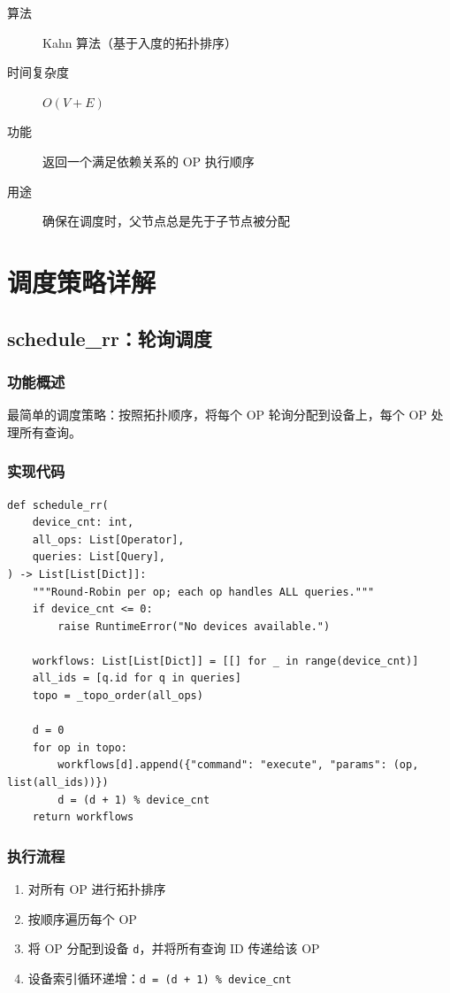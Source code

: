 \documentclass[12pt,a4paper]{article}
\begin{document}
\begin{description}
    \item[算法] Kahn 算法（基于入度的拓扑排序）
    \item[时间复杂度] $O(V + E)$
    \item[功能] 返回一个满足依赖关系的 OP 执行顺序
    \item[用途] 确保在调度时，父节点总是先于子节点被分配
\end{description}

\section{调度策略详解}

\subsection{schedule\_rr：轮询调度}

\subsubsection{功能概述}

最简单的调度策略：按照拓扑顺序，将每个 OP 轮询分配到设备上，每个 OP 处理所有查询。

\subsubsection{实现代码}

\begin{lstlisting}
def schedule_rr(
    device_cnt: int,
    all_ops: List[Operator],
    queries: List[Query],
) -> List[List[Dict]]:
    """Round-Robin per op; each op handles ALL queries."""
    if device_cnt <= 0:
        raise RuntimeError("No devices available.")
    
    workflows: List[List[Dict]] = [[] for _ in range(device_cnt)]
    all_ids = [q.id for q in queries]
    topo = _topo_order(all_ops)
    
    d = 0
    for op in topo:
        workflows[d].append({"command": "execute", "params": (op, list(all_ids))})
        d = (d + 1) % device_cnt
    return workflows
\end{lstlisting}

\subsubsection{执行流程}

\begin{enumerate}
    \item 对所有 OP 进行拓扑排序
    \item 按顺序遍历每个 OP
    \item 将 OP 分配到设备 \texttt{d}，并将所有查询 ID 传递给该 OP
    \item 设备索引循环递增：\texttt{d = (d + 1) \% device\_cnt}
\end{enumerate}
\end{document}
